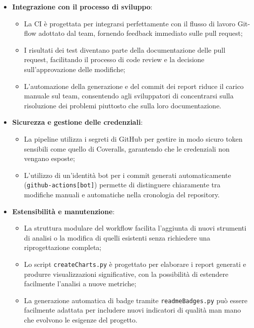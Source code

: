 \documentclass[10pt]{article}
\begin{document}
\begin{itemize}
    \item \textbf{Integrazione con il processo di sviluppo}:
    \begin{itemize}
        \item La CI è progettata per integrarsi perfettamente con il flusso di lavoro Git-flow adottato dal team, fornendo feedback immediato sulle pull request;
        \item I risultati dei test diventano parte della documentazione delle pull request, facilitando il processo di code review e la decisione sull'approvazione delle modifiche;
        \item L'automazione della generazione e del commit dei report riduce il carico manuale sul team, consentendo agli sviluppatori di concentrarsi sulla risoluzione dei problemi piuttosto che sulla loro documentazione.
    \end{itemize}
    
    \item \textbf{Sicurezza e gestione delle credenziali}:
    \begin{itemize}
        \item La pipeline utilizza i segreti di GitHub per gestire in modo sicuro token sensibili come quello di Coveralls, garantendo che le credenziali non vengano esposte;
        \item L'utilizzo di un'identità bot per i commit generati automaticamente (\texttt{github-actions[bot]}) permette di distinguere chiaramente tra modifiche manuali e automatiche nella cronologia del repository.
    \end{itemize}
    
    \item \textbf{Estensibilità e manutenzione}:
    \begin{itemize}
        \item La struttura modulare del workflow facilita l'aggiunta di nuovi strumenti di analisi o la modifica di quelli esistenti senza richiedere una riprogettazione completa;
        \item Lo script \texttt{createCharts.py} è progettato per elaborare i report generati e produrre visualizzazioni significative, con la possibilità di estendere facilmente l'analisi a nuove metriche;
        \item La generazione automatica di badge tramite \texttt{readmeBadges.py} può essere facilmente adattata per includere nuovi indicatori di qualità man mano che evolvono le esigenze del progetto.
    \end{itemize}
    \end{itemize}
\end{document}
